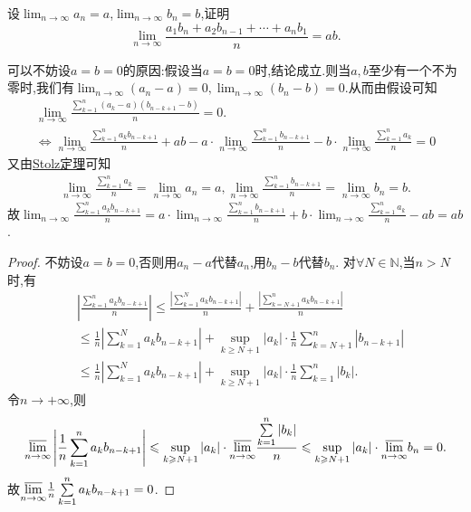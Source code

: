 \documentclass[../../main.tex]{subfiles}%
\begin{document}
\begin{proposition}\label{proposition:命题3.44}
设\(\lim_{n \to \infty} a_n = a\),\(\lim_{n \to \infty} b_n = b\),证明
\[
\lim_{n \to \infty} \frac{a_1 b_n + a_2 b_{n - 1} + \cdots + a_n b_1}{n} = ab.
\]
\end{proposition}
\begin{note}
可以不妨设$a=b=0$的原因:假设当$a=b=0$时,结论成立.则当$a,b$至少有一个不为零时,我们有$\lim_{n \to \infty} \left(a_n-a\right)=0,\lim_{n \to \infty} \left(b_n-b\right)=0$.从而由假设可知
\begin{gather*}
\lim_{n\rightarrow \infty} \frac{\sum\limits_{k=1}^n{\left( a_k-a \right) \left( b_{n-k+1}-b \right)}}{n}=0.
\\
\Leftrightarrow \lim_{n\rightarrow \infty} \frac{\sum\limits_{k=1}^n{a_kb_{n-k+1}}}{n}+ab-a\cdot \lim_{n\rightarrow \infty} \frac{\sum\limits_{k=1}^n{b_{n-k+1}}}{n}-b\cdot \lim_{n\rightarrow \infty} \frac{\sum\limits_{k=1}^n{a_k}}{n}=0
\end{gather*}
又由\hyperref[theorem:Stolz定理]{Stolz定理}可知
\begin{align*}
\lim_{n\rightarrow \infty} \frac{\sum\limits_{k=1}^n{a_k}}{n}=\lim_{n\rightarrow \infty} a_n=a,\lim_{n\rightarrow \infty} \frac{\sum\limits_{k=1}^n{b_{n-k+1}}}{n}=\lim_{n\rightarrow \infty} b_n=b.
\end{align*}
故$\lim_{n\rightarrow \infty} \frac{\sum\limits_{k=1}^n{a_kb_{n-k+1}}}{n}=a\cdot \lim_{n\rightarrow \infty} \frac{\sum\limits_{k=1}^n{b_{n-k+1}}}{n}+b\cdot \lim_{n\rightarrow \infty} \frac{\sum\limits_{k=1}^n{a_k}}{n}-ab=ab$.
\end{note}
\begin{proof}

不妨设$a=b=0$,否则用$a_n-a$代替$a_n$,用$b_n-b$代替$b_n$.
对$\forall N\in \mathbb{N}$,当$n>N$时,有
\begin{align*}
&\left|\frac{\sum\limits_{k = 1}^{n} a_k b_{n - k + 1}}{n}\right| \leqslant  \frac{\left|\sum\limits_{k = 1}^{N} a_k b_{n - k + 1}\right|}{n} + \frac{\left|\sum\limits_{k = N + 1}^{n} a_k b_{n - k + 1}\right|}{n}\\
&\leqslant  \frac{1}{n}\left|\sum\limits_{k = 1}^{N} a_k b_{n - k + 1}\right| + \sup_{k\geqslant  N + 1} |a_k| \cdot \frac{1}{n}\sum\limits_{k = N + 1}^{n} |b_{n - k + 1}|\\
&\leqslant  \frac{1}{n}\left|\sum\limits_{k = 1}^{N} a_k b_{n - k + 1}\right| + \sup_{k\geqslant  N + 1} |a_k| \cdot \frac{1}{n}\sum\limits_{k = 1}^{n} |b_k|.
\end{align*}
令$n\to+\infty$,则
\begin{align*}
\underset{n\rightarrow \infty}{{\varlimsup }}\left| \frac{1}{n}\sum\limits_{k=1}^n{a_kb_{n-k+1}} \right|\leqslant \mathop {\mathrm{sup}} \limits_{k\geqslant N+1}|a_k|\cdot \underset{n\rightarrow \infty}{{\varlimsup }}\frac{\sum\limits_{k=1}^n{\left| b_k \right|}}{n}\leqslant \mathop {\mathrm{sup}} \limits_{k\geqslant N+1}|a_k|\cdot \underset{n\rightarrow \infty}{{\varlimsup }}b_n=0.
\end{align*}
故$\underset{n\rightarrow \infty}{{\varlimsup }} \frac{1}{n}\sum\limits_{k=1}^n{a_kb_{n-k+1}} =0$.

\end{proof}
\end{document}
